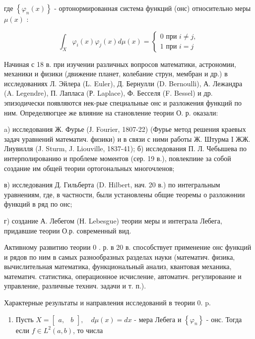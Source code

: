 \documentclass[10pt]{article}
\begin{document}
где $\left\{\varphi_{n}(x)\right\}$ - ортонормированная система функций (онс) относительно меры $\mu(x)$ :

\[
\int_{X} \varphi_{i}(x) \varphi_{j}(x) d \mu(x)=\left\{\begin{array}{l}
0 \text { при } i \neq j, \\
1 \text { при } i=j
\end{array}\right.
\]

Начиная с 18 в. при изучении различных вопросов математики, астрономии, механики и физики (движение планет, колебание струн, мембран и др.) в исследованиях Л. Эйлера (L. Euler), Д. Бернулли (D. Bernoulli), А. Лежандра (A. Legendre), П. Лапласа (Р. Laplace), Ф. Бесселя (F. Bessel) и др. эпизодически появляются нек-рые специальные онс и разложения функций по ним. Определяюгцее же влияние на становление теории О. р. оказали:

a) исследования Ж. Фурье (Ј. Fourier, 1807-22) (Фурье метод решения краевых задач уравнений математич. физики) и в связи с ними работы Ж. Штурма I ЖЖ. Лиувилля (J. Sturm, J. Liouville, 1837-41); б) исследования П. Л. Чебышева по интерполированию и проблеме моментов (сер. 19 в.), повлекпиие за собой создание им общей теории ортогональных многочленов;

в) исследования Д. Гильберта (D. Hilbert, нач. 20 в.) по интегральным уравнениям, где, в частности, были установлены общие теоремы о разложөнии функций в ряд по онс;

г) создание А. Лебегом (Н. Lebesgue) теории меры и интеграла Лебега, придавшие теории О.р. современный вид.

Активному развитию теории 0 . р. в 20 в. способствует применение онс функций и рядов по ним в самых разнообразных разделах науки (математич. физика, вычислительная математика, функциональный анализ, квантовая механика, математич. статистика, операционное исчисление, автоматич. регулирование и управление, различные технич. задачи и т. п.).

Характерные результаты и направления исследований в теории 0. p.

\begin{enumerate}
  \item Пусть $X=\left[\begin{array}{ll}a, & b\end{array}\right], \quad d \mu(x)=d x$ - мера Лебега и $\left\{\varphi_{n}\right\}$ - онс. Тогда если $f \in L^{2}(a, b)$, то числа
\end{enumerate}
\end{document}
